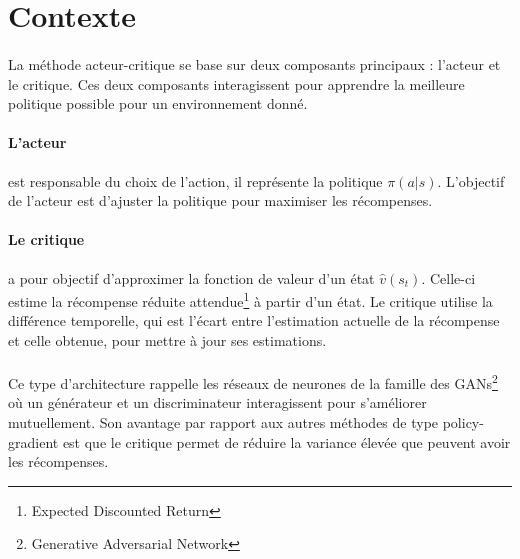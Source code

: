 \section{Contexte}

\paragraph{}
La méthode acteur-critique se base sur deux composants principaux : l'acteur et le critique. 
Ces deux composants interagissent pour apprendre la meilleure politique possible pour un environnement donné.

\vspace{-0.2cm}
\paragraph{L'acteur} est responsable du choix de l'action, il représente la politique $\pi(a|s)$. 
L'objectif de l'acteur est d'ajuster la politique pour maximiser les récompenses.

\vspace{-0.2cm}
\paragraph{Le critique} a pour objectif d'approximer la fonction de valeur d'un état $\hat{v}(s_t)$. 
Celle-ci estime la récompense réduite attendue\footnote{Expected Discounted Return} à partir d'un état.
Le critique utilise la différence temporelle, 
qui est l'écart entre l'estimation actuelle de la récompense et celle obtenue, pour mettre à jour ses estimations.

\vspace{-0.2cm}
\paragraph{}
Ce type d'architecture rappelle les réseaux de neurones de la famille des GANs\footnote{Generative Adversarial Network} 
où un générateur et un discriminateur interagissent pour s'améliorer mutuellement. Son avantage par rapport aux autres méthodes de type
policy-gradient est que le critique permet de réduire la variance élevée que peuvent avoir les récompenses.

